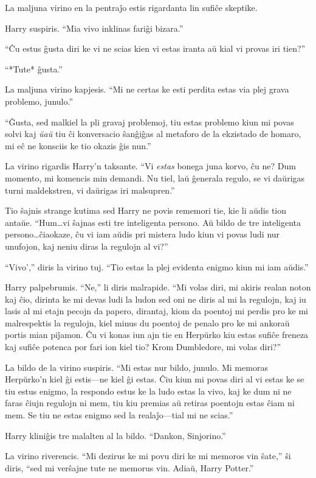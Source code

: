 La maljuna virino en la pentraĵo estis rigardanta lin sufiĉe skeptike.

Harry suspiris. ``Mia vivo inklinas fariĝi bizara.''

``Ĉu estus ĝusta diri ke vi ne scias kien vi estas iranta aŭ kial vi
provas iri tien?''

``*Tute* ĝusta.''

La maljuna virino kapjesis. ``Mi ne certas ke esti perdita estas via
plej grava problemo, junulo.''

``Ĝusta, sed malkiel la pli gravaj problemoj, tiu estas problemo kiun mi povas
solvi kaj \emph{ŭaŭ} tiu ĉi konversacio ŝanĝiĝas al metaforo de la ekzistado de
homaro, mi eĉ ne konsciis ke tio okazis ĝis nun.''

La virino rigardis Harry'n taksante. ``Vi \emph{estas} bonega juna
korvo, ĉu ne? Dum momento, mi komencis min demandi. Nu tiel, laŭ
ĝenerala regulo, se vi daŭrigas turni maldekstren, vi daŭrigas
iri malsupren.''

Tio ŝajnis strange kutima sed Harry ne povis rememori tie, kie li aŭdis tion
antaŭe. ``Hum\ldots vi ŝajnas esti tre inteligenta persono. Aŭ bildo de tre
inteligenta persono\ldots ĉiaokaze, ĉu vi iam aŭdis pri mistera ludo kiun vi povas
ludi nur unufojon, kaj neniu diras la regulojn al vi?''

``Vivo','' diris la virino tuj. ``Tio estas la plej evidenta enigmo
kiun mi iam aŭdis.''

Harry palpebrumis. ``Ne,'' li diris malrapide. ``Mi volas diri, mi akiris realan
noton kaj ĉio, dirinta ke mi devas ludi la ludon sed oni ne diris al mi la
regulojn, kaj iu lasis al mi etajn pecojn da papero, dirantaj, kiom da poentoj
mi perdis pro ke mi malrespektis la regulojn, kiel minus du poentoj de penalo
pro ke mi ankoraŭ portis mian piĵamon. Ĉu vi konas iun ajn tie en Herpŭrko kiu
estas sufiĉe freneza kaj sufiĉe potenca por fari ion kiel tio? Krom Dumbledore,
mi volas diri?''

La bildo de la virino suspiris. ``Mi estas nur bildo, junulo. Mi memoras
Herpŭrko'n kiel ĝi estis—ne kiel ĝi estas. Ĉiu kiun mi povas diri al vi estas ke
se tiu estus enigmo, la respondo estus ke la ludo estas la vivo, kaj ke dum ni
ne faras ĉiujn regulojn ni mem, tiu kiu premias aŭ retiras poentojn estas
ĉiam ni mem. Se tiu ne estas enigmo sed la realaĵo—tial mi ne scias.''

Harry kliniĝis tre malalten al la bildo. ``Dankon, Sinjorino.''

La virino riverencis. ``Mi dezirus ke mi povu diri ke mi memoros vin ŝate,'' ŝi
diris, ``sed mi verŝajne tute ne memorus vin. Adiaŭ, Harry Potter.''

